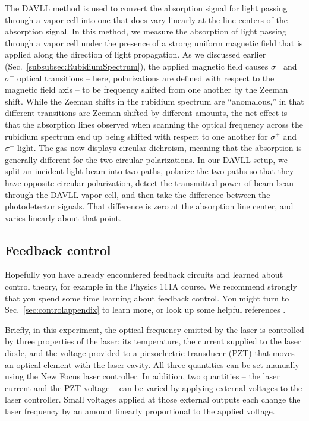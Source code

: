 \documentclass{../lab}
\begin{document}
The DAVLL method is used to convert the absorption signal for light passing through a vapor cell into one that does vary linearly at the line centers of the absorption signal.  In this method, we measure the absorption of light passing through a vapor cell under the presence of a strong uniform magnetic field that is applied along the direction of light propagation.  As we discussed earlier (Sec.\ \ref{subsubsec:RubidiumSpectrum}), the applied magnetic field causes $\sigma^+$ and $\sigma^-$ optical transitions -- here, polarizations are defined with respect to the magnetic field axis -- to be frequency shifted from one another by the Zeeman shift.   While the Zeeman shifts in the rubidium spectrum are ``anomalous,'' in that different transitions are Zeeman shifted by different amounts, the net effect is that the absorption lines observed when scanning the optical frequency across the rubidium spectrum end up being shifted with respect to one another for $\sigma^+$ and $\sigma^-$ light.  The gas now displays circular dichroism, meaning that the absorption is generally different for the two circular polarizations.  In our DAVLL setup, we split an incident light beam into two paths, polarize the two paths so that they have opposite circular polarization, detect the transmitted power of beam bean through the DAVLL vapor cell, and then take the difference between the photodetector signals. That difference is zero at the absorption line center, and varies linearly about that point.

\subsection{Feedback control}
\label{sec:control_abridged}

Hopefully you have already encountered feedback circuits and learned about control theory, for example in the Physics 111A course.  We recommend strongly that you spend some time learning about feedback control.  You might turn to Sec.\ \ref{sec:controlappendix} to learn more, or look up some helpful references \cite{DiStefano,Dorf,Bechhoefer}.

Briefly, in this experiment, the optical frequency emitted by the laser is controlled by three properties of the laser: its temperature, the current supplied to the laser diode, and the voltage provided to a piezoelectric transducer (PZT) that moves an optical element with the laser cavity.  All three quantities can be set manually using the New Focus laser controller.  In addition, two quantities -- the laser current and the PZT voltage -- can be varied by applying external voltages to the laser controller.  Small voltages applied at those external outputs each change the laser frequency by an amount linearly proportional to the applied voltage.
\end{document}
